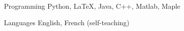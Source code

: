 


\begin{cvskills}

  \cvskill
    {Programming} %
    {Python, LaTeX, Java, C++, Matlab, Maple} %

  \cvskill
    {Languages} %
    {English, French (self-teaching)} %

\end{cvskills}
